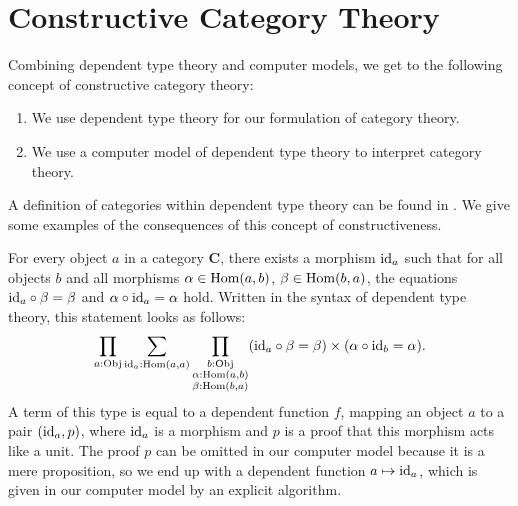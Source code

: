 \section{Constructive Category Theory}

Combining dependent type theory and computer models, we get to the following 
concept of constructive category theory:
\begin{enumerate}
 \item We use dependent type theory for our formulation of category theory.
 \item We use a computer model of dependent type theory to interpret category theory.
\end{enumerate}
A definition of categories within dependent type theory can be found in \cite{hottbook}.
We give some examples of the consequences of this concept of constructiveness.

\begin{example}[Identities]
 For every object $a$ in a category $\mathbf{C}$, there exists a morphism
 $\mathrm{id}_a$ such that for all objects $b$ and all morphisms $\alpha \in \operatorname{\mathrm{Hom}}( a, b )$, $\beta \in \operatorname{\mathrm{Hom}}( b, a )$,
 the equations $\mathrm{id}_a \circ \beta = \beta$ and $\alpha \circ \mathrm{id}_a = \alpha$ hold.
 Written in the syntax of dependent type theory, this statement looks as follows:
 \[
  \prod_{a:\mathrm{Obj}} \sum_{\mathrm{id}_a: \operatorname{\mathrm{Hom}}(a,a)} \prod_{\substack{ b: \mathrm{Obj} \\ \alpha: \operatorname{\mathrm{Hom}}(a,b) \\ \beta: \operatorname{\mathrm{Hom}}(b,a)}}( \mathrm{id}_a \circ \beta = \beta ) \times ( \alpha \circ \mathrm{id}_b = \alpha ).
 \]
 A term of this type is equal to a
 dependent function $f$, mapping an object $a$ to a pair $(\mathrm{id}_a, p)$,
 where $\mathrm{id}_a$ is a morphism and $p$ is a proof that this morphism acts like a unit.
 The proof $p$ can be omitted in our computer model because it is a mere proposition, so we end up
 with a dependent function $a \mapsto \mathrm{id}_a$, which is given in our computer model
 by an explicit algorithm.
\end{example}

